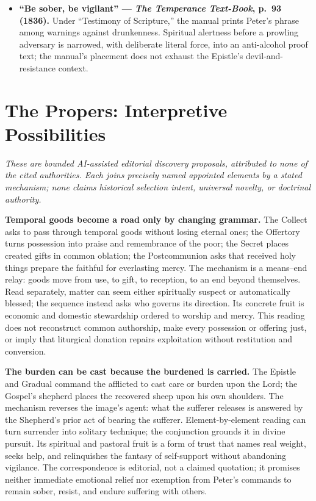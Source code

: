 \begin{deepstudy}
{\begin{itemize}
\item \textbf{``Be sober, be vigilant'' --- \emph{The Temperance Text-Book}, p.~93 (1836).} Under ``Testimony of Scripture,'' the manual prints Peter's phrase among warnings against drunkenness. Spiritual alertness before a prowling adversary is narrowed, with deliberate literal force, into an anti-alcohol proof text; the manual's placement does not exhaust the Epistle's devil-and-resistance context.
\end{itemize}
}

\section*{The Propers: Interpretive Possibilities}

\noindent\emph{These are bounded AI-assisted editorial discovery proposals, attributed to none of the cited authorities. Each joins precisely named appointed elements by a stated mechanism; none claims historical selection intent, universal novelty, or doctrinal authority.}

\noindent\textbf{Temporal goods become a road only by changing grammar.\enspace{}}
The Collect asks to pass through temporal goods without losing eternal ones; the Offertory turns possession into praise and remembrance of the poor; the Secret places created gifts in common oblation; the Postcommunion asks that received holy things prepare the faithful for everlasting mercy. The mechanism is a means--end relay: goods move from use, to gift, to reception, to an end beyond themselves. Read separately, matter can seem either spiritually suspect or automatically blessed; the sequence instead asks who governs its direction. Its concrete fruit is economic and domestic stewardship ordered to worship and mercy. This reading does not reconstruct common authorship, make every possession or offering just, or imply that liturgical donation repairs exploitation without restitution and conversion.

\noindent\textbf{The burden can be cast because the burdened is carried.\enspace{}}
The Epistle and Gradual command the afflicted to cast care or burden upon the Lord; the Gospel's shepherd places the recovered sheep upon his own shoulders. The mechanism reverses the image's agent: what the sufferer releases is answered by the Shepherd's prior act of bearing the sufferer. Element-by-element reading can turn surrender into solitary technique; the conjunction grounds it in divine pursuit. Its spiritual and pastoral fruit is a form of trust that names real weight, seeks help, and relinquishes the fantasy of self-support without abandoning vigilance. The correspondence is editorial, not a claimed quotation; it promises neither immediate emotional relief nor exemption from Peter's commands to remain sober, resist, and endure suffering with others.


\end{deepstudy}
